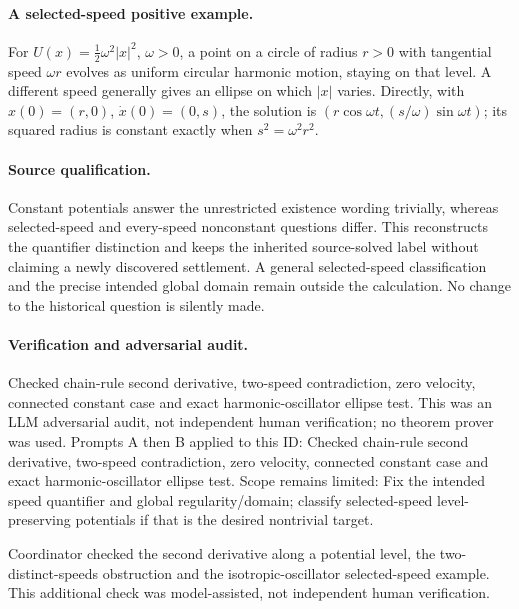 \documentclass[11pt]{article}
\begin{document}
\paragraph{A selected-speed positive example.}For \(U(x)=\tfrac12\omega^2|x|^2\), \(\omega>0\), a point on a circle of radius \(r>0\) with tangential speed \(\omega r\) evolves as uniform circular harmonic motion, staying on that level. A different speed generally gives an ellipse on which \(|x|\) varies. Directly, with \(x(0)=(r,0)\), \(\dot x(0)=(0,s)\), the solution is \((r\cos\omega t,(s/\omega)\sin\omega t)\); its squared radius is constant exactly when \(s^2=\omega^2r^2\).
\paragraph{Source qualification.}Constant potentials answer the unrestricted existence wording trivially, whereas selected-speed and every-speed nonconstant questions differ. This reconstructs the quantifier distinction and keeps the inherited source-solved label without claiming a newly discovered settlement. A general selected-speed classification and the precise intended global domain remain outside the calculation. No change to the historical question is silently made.

\paragraph{Verification and adversarial audit.}
Checked chain-rule second derivative, two-speed contradiction, zero velocity, connected constant case and exact harmonic-oscillator ellipse test. This was an LLM adversarial audit, not independent human verification; no theorem prover was used. Prompts A then B applied to this ID: Checked chain-rule second derivative, two-speed contradiction, zero velocity, connected constant case and exact harmonic-oscillator ellipse test. Scope remains limited: Fix the intended speed quantifier and global regularity/domain; classify selected-speed level-preserving potentials if that is the desired nontrivial target.

Coordinator checked the second derivative along a potential level, the two-distinct-speeds obstruction and the isotropic-oscillator selected-speed example. This additional check was model-assisted, not independent human verification.
\end{document}
